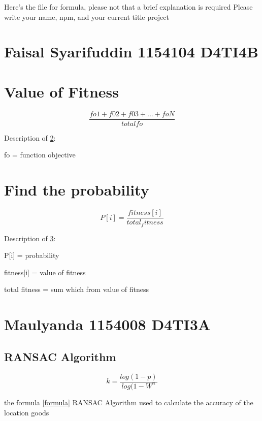 Here's the file for formula, please not that a brief explanation is required
Please write your name, npm, and your current title project
\section{Faisal Syarifuddin 1154104 D4TI4B}

\section{Value of Fitness}
    \label{fitness}
    \begin{equation}
        \frac{fo1 + f02 + f03 + ... + foN}{total fo}
    \end{equation}
    \par Description of \ref{fitness}:
    \par fo = function objective

\section{Find the probability}
    \label{ptobabilty}
    \begin{equation}
        P[i] = \frac{fitness[i]}{total_fitness}
    \end{equation}
    \par Description of \ref{ptobabilty}:
    \par P[i] = probability
    \par fitness[i] = value of fitness
    \par total fitness = sum which from value of fitness

\section{Maulyanda 1154008 D4TI3A}
\subsection{RANSAC Algorithm}
    \label{Formula}
    \begin{equation}
        k = \frac{log(1-p)}{log(1-W^n}
    \end{equation}

    the formula \ref{formula} RANSAC Algorithm used to calculate the accuracy of the location goods
